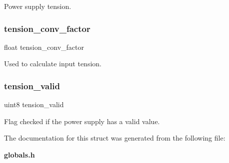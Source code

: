Power supply tension. \mbox{\label{structst__dev_a723ea162acc920523660a38a950867e9}} 
\subsubsection{tension\+\_\+conv\+\_\+factor}
{\footnotesize\ttfamily float tension\+\_\+conv\+\_\+factor}

Used to calculate input tension. \mbox{\label{structst__dev_a7d15e08bea2712230bee720a38bca2a7}} 
\subsubsection{tension\+\_\+valid}
{\footnotesize\ttfamily uint8 tension\+\_\+valid}

Flag checked if the power supply has a valid value. 

The documentation for this struct was generated from the following file\+:\begin{DoxyCompactItemize}
\item 
\textbf{ globals.\+h}\end{DoxyCompactItemize}
